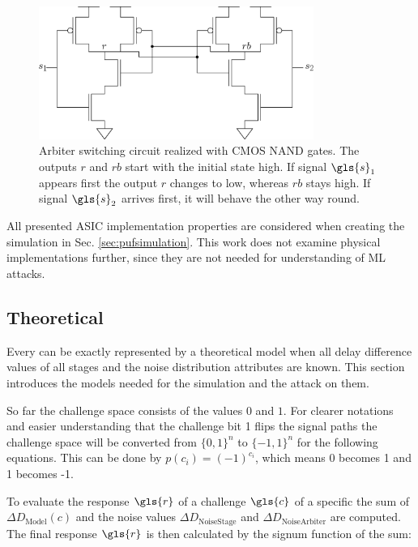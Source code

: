 \begin{figure}[ht]
\centering
\includegraphics[width=0.80\textwidth]{images/arbiter_circuit.eps}
\caption[Arbiter circuit]{Arbiter switching circuit realized with \ac{CMOS} NAND gates. The outputs $r$ and $rb$ start with the initial state high. If signal $\gls{s}_1$ appears first the output $r$ changes to low, whereas $rb$ stays high. If signal $\gls{s}_2$ arrives first, it will behave the other way round.}
\label{fig:nandarbiter}
\end{figure}

All presented \apuf \ac{ASIC} implementation properties are considered when creating the \apuf simulation in Sec. \ref{sec:pufsimulation}.
This work does not examine physical \apuf implementations further, since they are not needed for understanding of \ac{ML} attacks.


\subsection{Theoretical}
\label{sec:theoretical}

Every \apuf can be exactly represented by a theoretical model when all delay difference values of all stages and the noise distribution attributes are known.
This section introduces the \apuf models needed for the simulation and the attack on them.

So far the challenge space consists of the values $0$ and $1$.
For clearer notations and easier understanding that the challenge bit 1 flips the signal paths the challenge space will be converted from $\{0, 1\}^n$ to $\{-1, 1\}^n$ for the following equations.
This can be done by $p(c_i) = (-1)^{c_i}$, which means 0 becomes 1 and 1 becomes -1.

To evaluate the response $\gls{r}$ of a challenge $\gls{c}$ of a specific \puf the sum of $\Delta D_{\mathrm{Model}}(c)$ and the noise values $\Delta D_{\mathrm{Noise Stage}}$ and $\Delta D_{\mathrm{Noise Arbiter}}$ are computed.
The final response $\gls{r}$ is then calculated by the signum function of the sum:

